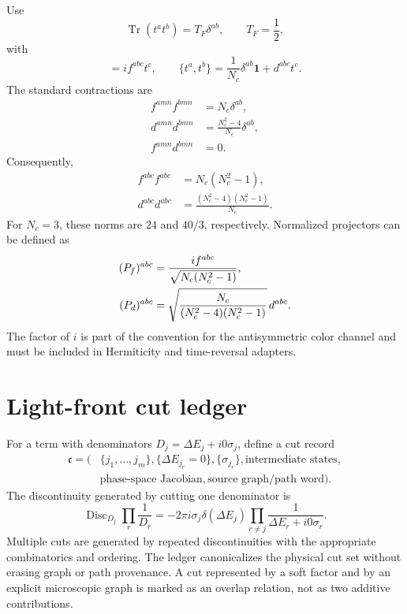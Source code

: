 \documentclass[11pt]{article}
\newcommand{\Tr}{\operatorname{Tr}}
\newcommand{\Disc}{\operatorname{Disc}}
\newcommand{\bbone}{\bm 1}
\begin{document}
Use
\begin{equation}
 \Tr(t^at^b)=T_F\delta^{ab},
 \qquad T_F=\frac12,
\label{eq:generator-normalization}
\end{equation}
with
\begin{equation}
 [t^a,t^b]=if^{abc}t^c,
 \qquad
 \{t^a,t^b\}=\frac1{N_c}\delta^{ab}\bbone+d^{abc}t^c.
\label{eq:fd-definitions}
\end{equation}
The standard contractions are
\begin{align}
 f^{amn}f^{bmn}&=N_c\delta^{ab},
\label{eq:f-contraction}\\
 d^{amn}d^{bmn}&=\frac{N_c^2-4}{N_c}\delta^{ab},
\label{eq:d-contraction}\\
 f^{amn}d^{bmn}&=0.
\label{eq:fd-contraction-orthogonality}
\end{align}
Consequently,
\begin{align}
 f^{abc}f^{abc}&=N_c(N_c^2-1),
\label{eq:f-norm}\\
 d^{abc}d^{abc}&=\frac{(N_c^2-4)(N_c^2-1)}{N_c}.
\label{eq:d-norm}
\end{align}
For \(N_c=3\), these norms are \(24\) and \(40/3\), respectively.
Normalized projectors can be defined as
\begin{align}
 (P_f)^{abc}
 &=\frac{if^{abc}}{\sqrt{N_c(N_c^2-1)}},
\notag\\
 (P_d)^{abc}
 &=\sqrt{\frac{N_c}{(N_c^2-4)(N_c^2-1)}}\,d^{abc}.
\label{eq:normalized-fd-projectors}
\end{align}
The factor of \(i\) is part of the convention for the antisymmetric color
channel and must be included in Hermiticity and time-reversal adapters.

\section{Light-front cut ledger}
\label{app:cuts}

For a term with denominators \(D_j=\Delta E_j+i0\sigma_j\), define a cut
record
\begin{equation}
\begin{aligned}
 \mathfrak c=\bigl(&
 \{j_1,\ldots,j_m\},\{\Delta E_{j_r}=0\},\{\sigma_{j_r}\},
 \text{intermediate states},\\
 &\text{phase-space Jacobian},\text{source graph/path word}\bigr).
\end{aligned}
\label{eq:cut-record}
\end{equation}
The discontinuity generated by cutting one denominator is
\begin{equation}
 \Disc_{D_j}
 \prod_{r}\frac1{D_r}
 =-2\pi i\sigma_j\delta(\Delta E_j)
  \prod_{r\ne j}\frac1{\Delta E_r+i0\sigma_r}.
\label{eq:single-cut-product}
\end{equation}
Multiple cuts are generated by repeated discontinuities with the appropriate
combinatorics and ordering.  The ledger canonicalizes the physical cut set
without erasing graph or path provenance.  A cut represented by a soft
factor and by an explicit microscopic graph is marked as an overlap relation,
not as two additive contributions.
\end{document}
